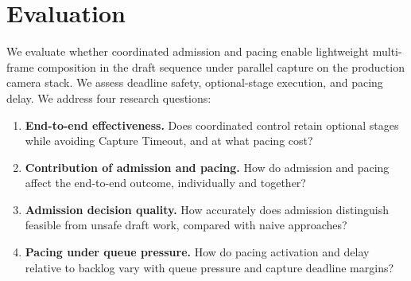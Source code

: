 \section{Evaluation}

\label{sec:evaluation}

We evaluate whether coordinated admission and pacing enable lightweight multi-frame composition in the draft sequence under parallel capture on the production camera stack.
We assess deadline safety, optional-stage execution, and pacing delay.
We address four research questions:

\begin{enumerate}[label=\textbf{RQ\arabic*:}, leftmargin=4.8em]
  \item \textbf{End-to-end effectiveness.}
  Does coordinated control retain optional stages while avoiding Capture Timeout, and at what pacing cost?

  \item \textbf{Contribution of admission and pacing.}
  How do admission and pacing affect the end-to-end outcome, individually and together?

  \item \textbf{Admission decision quality.}
  How accurately does admission distinguish feasible from unsafe draft work, compared with naive approaches?
 
  \item \textbf{Pacing under queue pressure.}
  How do pacing activation and delay relative to backlog vary with queue pressure and capture deadline margins?
\end{enumerate}








